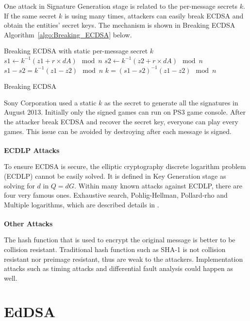 \documentclass[10pt,sigconf]{acmart}
\begin{document}
One attack in Signature Generation stage is related to the per-message secrets $k$. If the same secret $k$ is using many times, attackers can easily break ECDSA and obtain the entities' secret keys. The mechanism is shown in Breaking ECDSA Algorithm~\ref{algo:Breaking_ECDSA} below.

\begin{algorithm}
\begin{algorithmic}
\STATE Breaking ECDSA with static per-message secret $k$
\STATE $s1 \gets k^{-1}(z1 + r \times dA) \mod n$
\STATE $s2 \gets k^{-1}(z2 + r \times dA) \mod n$
\STATE $s1 - s2 = k^{-1}(z1 - z2) \mod n$
\STATE $k = (s1 - s2)^{-1} (z1 - z2) \mod n$ 
\end{algorithmic}
\caption{Breaking ECDSA}
\label{algo:Breaking_ECDSA}
\end{algorithm}

Sony Corporation used a static $k$ as the secret to generate all the signatures in August 2013. Initially only the signed games can run on PS3 game console. After the attacker break ECDSA and recover the secret key, everyone can play every games. This issue can be avoided by destroying after each message is signed.
\\
\\
\noindent \textbf{ECDLP Attacks}

To ensure ECDSA is secure, the elliptic cryptography discrete logarithm problem (ECDLP) cannot be easily solved. It is defined in Key Generation stage as solving for $d$ in $Q=dG$. Within many known attacks against ECDLP, there are four very famous ones. Exhaustive search, Pohlig-Hellman, Pollard-rho and Multiple logarithms, which are described details in \cite{johnson2001elliptic}. 
\\
\\
\noindent \textbf{Other Attacks}

The hash function that is used to encrypt the original message is better to be collision resistant. Traditional hash function such as SHA-1 is not collision resistant nor preimage resistant, thus are weak to the attackers. Implementation attacks such as timing attacks and differential fault analysis could happen as well.






\section{EdDSA}
\end{document}
